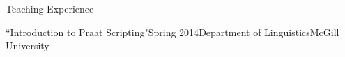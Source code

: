 \documentclass{resume} %
\begin{document}
\begin{rSection}{Teaching Experience}
	
	\begin{rSubsection}{``Introduction to Praat Scripting"}{Spring 2014}{Department of Linguistics}{McGill University}
	\end{rSubsection}

\end{rSection}






\end{document}
